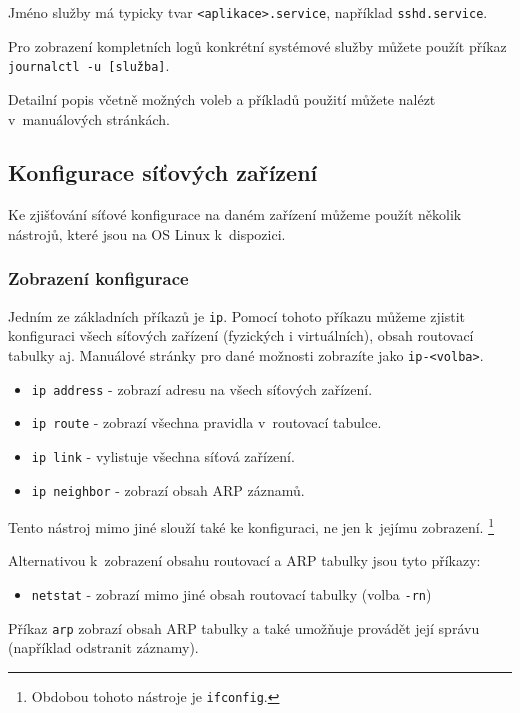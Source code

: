 Jméno služby má typicky tvar \texttt{<aplikace>.service}, například
\texttt{sshd.service}.

Pro zobrazení kompletních logů konkrétní systémové služby můžete použít příkaz
\texttt{journalctl -u [služba]}.

Detailní popis včetně možných voleb a příkladů použití můžete nalézt
v~manuálových stránkách.



\subsection{Konfigurace síťových zařízení}
Ke zjišťování síťové konfigurace na daném zařízení můžeme použít několik nástrojů,
které jsou na OS Linux k~dispozici.

\subsubsection{Zobrazení konfigurace}
Jedním ze základních příkazů je \texttt{ip}. Pomocí tohoto příkazu můžeme zjistit
konfiguraci všech síťových zařízení (fyzických i virtuálních), obsah routovací tabulky aj. Manuálové stránky pro dané možnosti zobrazíte jako \texttt{ip-<volba>}.

\begin{itemize}
				\item \texttt{ip address} - zobrazí adresu na všech síťových zařízení.
				\item \texttt{ip route} - zobrazí všechna pravidla v~routovací tabulce.
				\item \texttt{ip link} - vylistuje všechna síťová zařízení.
				\item \texttt{ip neighbor} - zobrazí obsah ARP záznamů.
\end{itemize}

Tento nástroj mimo jiné slouží také ke konfiguraci, ne jen k~jejímu zobrazení. \footnote{Obdobou tohoto nástroje je \texttt{ifconfig}.}


Alternativou k~zobrazení obsahu routovací a ARP tabulky jsou tyto příkazy:
\begin{itemize}
\item \texttt{netstat} - zobrazí mimo jiné obsah routovací tabulky (volba \texttt{-rn})
\end{itemize}

Příkaz \texttt{arp} zobrazí obsah ARP tabulky a také umožňuje provádět její
správu (například odstranit záznamy).

